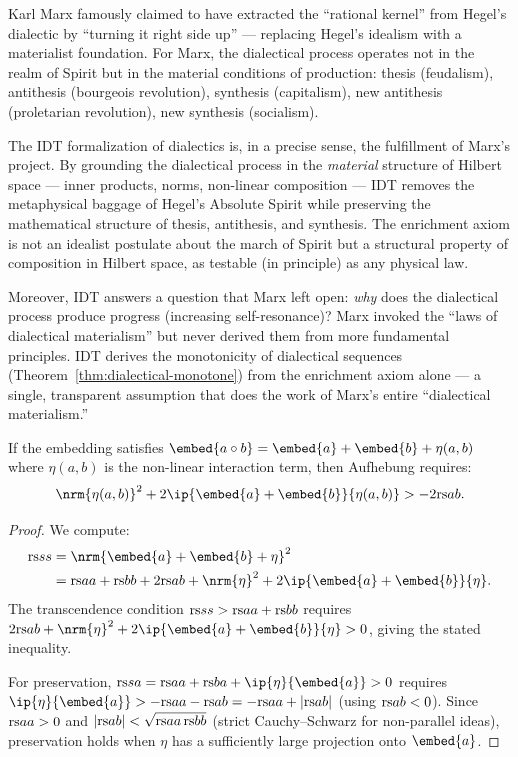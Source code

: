 \begin{interpretation}
\label{interp:ch16:marx_rational_kernel}
Karl Marx famously claimed to have extracted the ``rational kernel'' from
Hegel's dialectic by ``turning it right side up'' --- replacing Hegel's
idealism with a materialist foundation.  For Marx, the dialectical process
operates not in the realm of Spirit but in the material conditions of
production: thesis (feudalism), antithesis (bourgeois revolution), synthesis
(capitalism), new antithesis (proletarian revolution), new synthesis
(socialism).

The IDT formalization of dialectics is, in a precise sense, the
fulfillment of Marx's project.  By grounding the dialectical process in
the \emph{material} structure of Hilbert space --- inner products, norms,
non-linear composition --- IDT removes the metaphysical baggage of Hegel's
Absolute Spirit while preserving the mathematical structure of thesis,
antithesis, and synthesis.  The enrichment axiom is not an idealist
postulate about the march of Spirit but a structural property of
composition in Hilbert space, as testable (in principle) as any physical
law.

Moreover, IDT answers a question that Marx left open: \emph{why} does the
dialectical process produce progress (increasing self-resonance)?  Marx
invoked the ``laws of dialectical materialism'' but never derived them from
more fundamental principles.  IDT derives the monotonicity of dialectical
sequences (Theorem~\ref{thm:dialectical-monotone}) from the enrichment
axiom alone --- a single, transparent assumption that does the work of
Marx's entire ``dialectical materialism.''
\end{interpretation}

\begin{theorem}
\label{thm:aufhebung-conditions}
If the embedding satisfies $\embed{a \compose b} = \embed{a} + \embed{b} +
\eta(a,b)$ where $\eta(a,b)$ is the non-linear interaction term, then
Aufhebung requires:
\[
  \nrm{\eta(a,b)}^2 + 2\ip{\embed{a} + \embed{b}}{\eta(a,b)} > -2\rs{a}{b}.
\]
\end{theorem}

\begin{proof}
We compute:
\begin{align*}
  \rs{s}{s} &= \nrm{\embed{a} + \embed{b} + \eta}^2 \\
  &= \rs{a}{a} + \rs{b}{b} + 2\rs{a}{b} + \nrm{\eta}^2
    + 2\ip{\embed{a} + \embed{b}}{\eta}.
\end{align*}
The transcendence condition $\mathrm{rs}{s}{s} > \mathrm{rs}{a}{a} + \mathrm{rs}{b}{b}$ requires
$2\rs{a}{b} + \nrm{\eta}^2 + 2\ip{\embed{a} + \embed{b}}{\eta} > 0$, giving
the stated inequality.

For preservation, $\rs{s}{a} = \rs{a}{a} + \rs{b}{a} + \ip{\eta}{\embed{a}}
> 0$ requires $\ip{\eta}{\embed{a}} > -\rs{a}{a} - \rs{a}{b} =
-\rs{a}{a} + |\rs{a}{b}|$ (using $\mathrm{rs}{a}{b} < 0$).  Since $\mathrm{rs}{a}{a} > 0$
and $|\mathrm{rs}{a}{b}| < \sqrt{\mathrm{rs}{a}{a}\,\mathrm{rs}{b}{b}}$ (strict Cauchy--Schwarz for
non-parallel ideas), preservation holds when $\eta$ has a sufficiently large
projection onto $\embed{a}$.
\end{proof}

